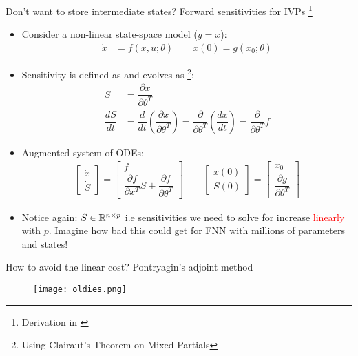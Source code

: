 \documentclass[dvipsnames, 9pt]{beamer}
\begin{document}
\begin{frame}{Don't want to store intermediate states? Forward sensitivities for IVPs \footnote{Derivation in \cite{rawlings:ekerdt:2020}}}
    \begin{itemize}
    \item Consider a non-linear state-space model ($y=x$):
    \begin{align*}
        \dot{x} &= f(x, u; \theta) \qquad x(0) = g(x_0; \theta)
    \end{align*}
    \item Sensitivity is defined as and evolves as \footnote{Using Clairaut's Theorem on Mixed Partials}:
    \begin{align*}
        S &= \dfrac{\partial x}{\partial \theta^T} \\
        \dfrac{d S}{dt} &= \dfrac{d}{dt} \left(\dfrac{\partial x}{\partial \theta^T}\right) =
        \dfrac{\partial}{\partial\theta^T} \left(\dfrac{d x}{dt}\right) = 
        \dfrac{\partial }{\partial \theta^T} f
    \end{align*}
    \item Augmented system of ODEs:
    \begin{align*}
        \begin{bmatrix} \dot{x} \\ \dot{S} \end{bmatrix} = 
        \begin{bmatrix} f \\ \dfrac{\partial f}{\partial x^T}S + \dfrac{\partial f}{\partial \theta^T} \end{bmatrix}
        \qquad
        \begin{bmatrix} x(0) \\ S(0) \end{bmatrix} =
        \begin{bmatrix} x_0 \\ \dfrac{\partial g}{\partial \theta^T} \end{bmatrix}
    \end{align*}
    \item Notice again: $S\in \mathbb{R}^{n\times p}$ i.e sensitivities we need to solve
    for increase \textcolor{red}{linearly} with $p$. Imagine how bad this could get for FNN with millions of parameters and 
    states!
    \end{itemize}
\end{frame}


\begin{frame}{How to avoid the linear cost? Pontryagin's adjoint method}
    \begin{figure}
        \centering
        \texttt{[image: oldies.png]}\\
    \end{figure}
\end{frame}
\end{document}

